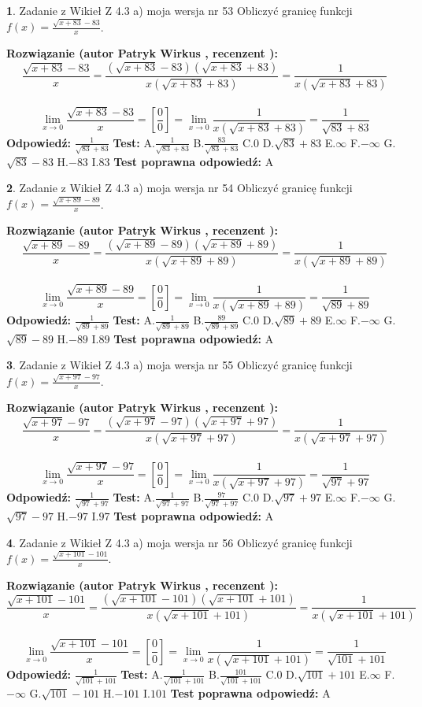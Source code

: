 \documentclass[12pt, a4paper]{article}
\theoremstyle{definition} %
\newtheorem{zad}{}
\newcommand{\zadStart}[1]{\begin{zad}#1\newline}
\newcommand{\zadStop}{\end{zad}}
\newcommand{\rozwStart}[2]{\noindent \textbf{Rozwiązanie (autor #1 , recenzent #2): }\newline}
\newcommand{\rozwStop}{\newline}
\newcommand{\odpStart}{\noindent \textbf{Odpowiedź:}\newline}
\newcommand{\odpStop}{\newline}
\newcommand{\testStart}{\noindent \textbf{Test:}\newline}
\newcommand{\testStop}{\newline}
\newcommand{\kluczStart}{\noindent \textbf{Test poprawna odpowiedź:}\newline}
\newcommand{\kluczStop}{\newline}
\begin{document}
\zadStart{Zadanie z Wikieł Z 4.3 a) moja wersja nr 53}
Obliczyć granicę funkcji $f(x)=\frac{\sqrt{x+83}-83}{x}$.
\zadStop
\rozwStart{Patryk Wirkus}{}
$$\frac{\sqrt{x+83}-83}{x}=\frac{(\sqrt{x+83}-83)(\sqrt{x+83}+83)}{x(\sqrt{x+83}+83)}=\frac{1}{x(\sqrt{x+83}+83)}$$
\\
$$\lim\limits_{x\to0}\frac{\sqrt{x+83}-83}{x}=[\frac{0}{0}]=
\lim\limits_{x\to0}\frac{1}{x(\sqrt{x+83}+83)} = \frac{1}{\sqrt{83}+83}$$
\rozwStop
\odpStart
$\frac{1}{\sqrt{83}+83}$
\odpStop
\testStart
A.$\frac{1}{\sqrt{83}+83}$
B.$\frac{83}{\sqrt{83}+83}$
C.$0$
D.$\sqrt{83}+83$
E.$\infty$
F.$-\infty$
G.$\sqrt{83}-83$
H.$-83$
I.$83$
\testStop
\kluczStart
A
\kluczStop



\zadStart{Zadanie z Wikieł Z 4.3 a) moja wersja nr 54}
Obliczyć granicę funkcji $f(x)=\frac{\sqrt{x+89}-89}{x}$.
\zadStop
\rozwStart{Patryk Wirkus}{}
$$\frac{\sqrt{x+89}-89}{x}=\frac{(\sqrt{x+89}-89)(\sqrt{x+89}+89)}{x(\sqrt{x+89}+89)}=\frac{1}{x(\sqrt{x+89}+89)}$$
\\
$$\lim\limits_{x\to0}\frac{\sqrt{x+89}-89}{x}=[\frac{0}{0}]=
\lim\limits_{x\to0}\frac{1}{x(\sqrt{x+89}+89)} = \frac{1}{\sqrt{89}+89}$$
\rozwStop
\odpStart
$\frac{1}{\sqrt{89}+89}$
\odpStop
\testStart
A.$\frac{1}{\sqrt{89}+89}$
B.$\frac{89}{\sqrt{89}+89}$
C.$0$
D.$\sqrt{89}+89$
E.$\infty$
F.$-\infty$
G.$\sqrt{89}-89$
H.$-89$
I.$89$
\testStop
\kluczStart
A
\kluczStop



\zadStart{Zadanie z Wikieł Z 4.3 a) moja wersja nr 55}
Obliczyć granicę funkcji $f(x)=\frac{\sqrt{x+97}-97}{x}$.
\zadStop
\rozwStart{Patryk Wirkus}{}
$$\frac{\sqrt{x+97}-97}{x}=\frac{(\sqrt{x+97}-97)(\sqrt{x+97}+97)}{x(\sqrt{x+97}+97)}=\frac{1}{x(\sqrt{x+97}+97)}$$
\\
$$\lim\limits_{x\to0}\frac{\sqrt{x+97}-97}{x}=[\frac{0}{0}]=
\lim\limits_{x\to0}\frac{1}{x(\sqrt{x+97}+97)} = \frac{1}{\sqrt{97}+97}$$
\rozwStop
\odpStart
$\frac{1}{\sqrt{97}+97}$
\odpStop
\testStart
A.$\frac{1}{\sqrt{97}+97}$
B.$\frac{97}{\sqrt{97}+97}$
C.$0$
D.$\sqrt{97}+97$
E.$\infty$
F.$-\infty$
G.$\sqrt{97}-97$
H.$-97$
I.$97$
\testStop
\kluczStart
A
\kluczStop



\zadStart{Zadanie z Wikieł Z 4.3 a) moja wersja nr 56}
Obliczyć granicę funkcji $f(x)=\frac{\sqrt{x+101}-101}{x}$.
\zadStop
\rozwStart{Patryk Wirkus}{}
$$\frac{\sqrt{x+101}-101}{x}=\frac{(\sqrt{x+101}-101)(\sqrt{x+101}+101)}{x(\sqrt{x+101}+101)}=\frac{1}{x(\sqrt{x+101}+101)}$$
\\
$$\lim\limits_{x\to0}\frac{\sqrt{x+101}-101}{x}=[\frac{0}{0}]=
\lim\limits_{x\to0}\frac{1}{x(\sqrt{x+101}+101)} = \frac{1}{\sqrt{101}+101}$$
\rozwStop
\odpStart
$\frac{1}{\sqrt{101}+101}$
\odpStop
\testStart
A.$\frac{1}{\sqrt{101}+101}$
B.$\frac{101}{\sqrt{101}+101}$
C.$0$
D.$\sqrt{101}+101$
E.$\infty$
F.$-\infty$
G.$\sqrt{101}-101$
H.$-101$
I.$101$
\testStop
\kluczStart
A
\kluczStop
\end{document}
